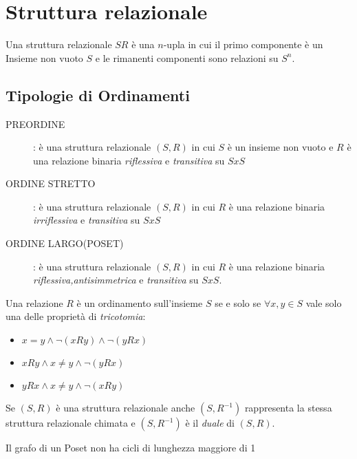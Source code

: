 \section{Struttura relazionale}
Una struttura relazionale $SR$ è una $n$-upla in cui il primo componente è un Insieme
non vuoto $S$ e le rimanenti componenti sono relazioni su $S^n$.

\subsection{Tipologie di Ordinamenti}
\begin{description}
    \item[PREORDINE]: è una struttura relazionale $(S,R)$ in cui $S$ è un insieme non vuoto
          e $R$ è una relazione binaria \emph{riflessiva} e \emph{transitiva} su $S x S$
    \item[ORDINE STRETTO]: è una struttura relazionale $(S,R)$ in cui $R$ è una
          relazione binaria \emph{irriflessiva} e \emph{transitiva} su $S x S$
    \item[ORDINE LARGO(POSET)]: è una struttura relazionale $(S,R)$ in cui $R$ è una
          relazione binaria \emph{riflessiva,antisimmetrica} e \emph{transitiva} su $S x S$.
\end{description}

Una relazione $R$ è un ordinamento sull'insieme $S$ se e solo se $\forall x,y \in S$
vale solo una delle proprietà di \emph{tricotomia}:
\begin{itemize}
    \item $x = y \land \neg(xRy) \land \neg(yRx)$
    \item $xRy \land x \neq y \land \neg(yRx)$
    \item $yRx \land x \neq y \land \neg(xRy)$
\end{itemize}

\begin{prop}
Se $(S,R)$ è una struttura relazionale anche $(S,R^{-1})$ rappresenta la stessa
struttura relazionale chimata e $(S,R^{-1})$ è il \emph{duale} di $(S,R)$.
\end{prop}


\begin{prop}
Il grafo di un Poset non ha cicli di lunghezza maggiore di 1
\end{prop}


